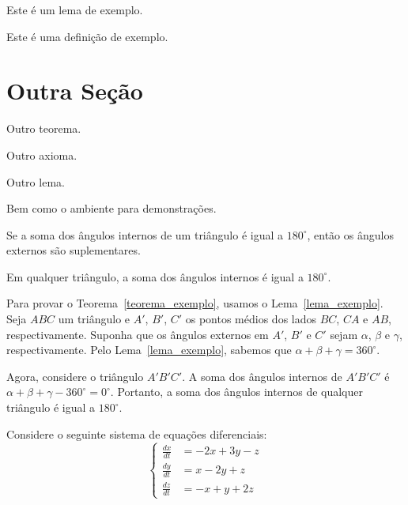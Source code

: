 \documentclass[
	article,			%
	11pt,				%
	oneside,			%
	a4paper,			%
	chapter=TITLE,
	english,			%
	brazil,				%
	sumario=tradicional
	]{templateimtec}
\begin{document}
\begin{lema}
	Este é um lema de exemplo.
\end{lema}
   
\begin{definicao}
	Este é uma definição de exemplo.
\end{definicao}
   
\section{Outra Seção}
   
\begin{teorema}
	Outro teorema.
\end{teorema}
   
\begin{axioma}
	Outro axioma.
\end{axioma}
   
\begin{lema}
	Outro lema.
\end{lema}

Bem como o ambiente para demonstrações.

\begin{lema}\label{lema_exemplo}
	Se a soma dos ângulos internos de um triângulo é igual a $180^\circ$, então os ângulos externos são suplementares.
\end{lema}
      
\begin{teorema}\label{teorema_exemplo}
	Em qualquer triângulo, a soma dos ângulos internos é igual a $180^\circ$.
\end{teorema}
      
\begin{demonstracao}
	Para provar o Teorema~\ref{teorema_exemplo}, usamos o Lema~\ref{lema_exemplo}. Seja $ABC$ um triângulo e $A'$, $B'$, $C'$ os pontos médios dos lados $BC$, $CA$ e $AB$, respectivamente. Suponha que os ângulos externos em $A'$, $B'$ e $C'$ sejam $\alpha$, $\beta$ e $\gamma$, respectivamente. Pelo Lema~\ref{lema_exemplo}, sabemos que $\alpha + \beta + \gamma = 360^\circ$.
	      
	Agora, considere o triângulo $A'B'C'$. A soma dos ângulos internos de $A'B'C'$ é $\alpha + \beta + \gamma - 360^\circ = 0^\circ$. Portanto, a soma dos ângulos internos de qualquer triângulo é igual a $180^\circ$.
\end{demonstracao}

Considere o seguinte sistema de equações diferenciais:
\[
\begin{cases}
\frac{dx}{dt} &= -2x + 3y - z \\
\frac{dy}{dt} &= x - 2y + z \\
\frac{dz}{dt} &= -x + y + 2z
\end{cases}
\]
\end{document}
